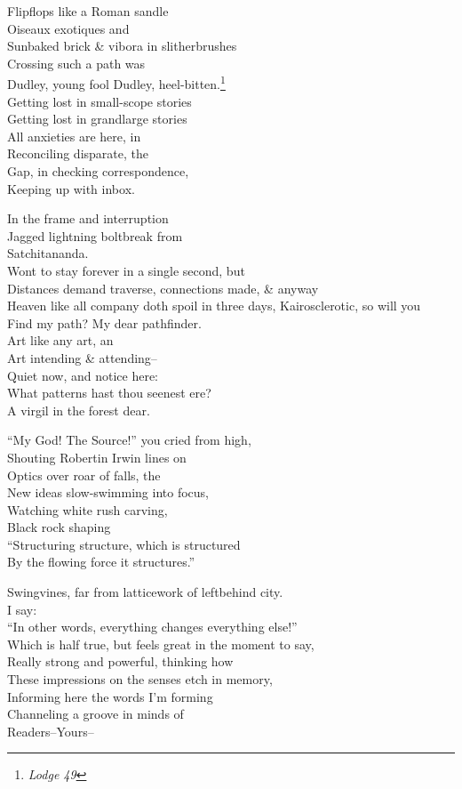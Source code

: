 \secdiv

Flipflops like a Roman sandle \\
Oiseaux exotiques and \\
Sunbaked brick \& vibora in slitherbrushes \\
Crossing such a path was \\
Dudley, young fool Dudley, heel-bitten.\footnote{\textit{Lodge 49}} \\

Getting lost in small-scope stories \\
Getting lost in grandlarge stories \\
All anxieties are here, in \\
Reconciling disparate, the \\ 
Gap, in checking correspondence, \\
Keeping up with inbox.

In the frame and interruption \\
Jagged lightning boltbreak from \\
Satchitananda. \\
Wont to stay forever in a single second, but \\
Distances demand traverse, connections made, \& anyway \\
Heaven like all company doth spoil in three days,
Kairosclerotic, so will you \\
Find my path? My dear pathfinder. \\
Art like any art, an \\
Art intending \& attending-- \\
Quiet now, and notice here: \\
What patterns hast thou seenest ere? \\
A virgil in the forest dear.

\secdiv

``My God! The Source!'' you cried from high, \\
Shouting Robertin Irwin lines on \\
Optics over roar of falls, the \\
New ideas slow-swimming into focus, \\
Watching white rush carving, \\
Black rock shaping \\
``Structuring structure, which is structured \\
By the flowing force it structures.''

Swingvines, far from latticework of leftbehind city. \\
I say: \\
``In other words, everything changes everything else!'' \\
Which is half true, but feels great in the moment to say, \\
Really strong and powerful, thinking how \\
These impressions on the senses etch in memory, \\
Informing here the words I'm forming \\
Channeling a groove in minds of \\
Readers--Yours--


